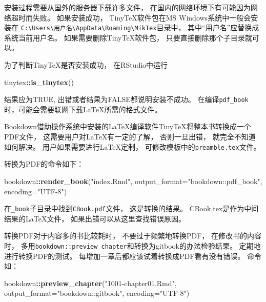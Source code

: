 \documentclass[
]{book}
\newenvironment{Shaded}{\begin{snugshade}}{\end{snugshade}}
\newcommand{\DataTypeTok}[1]{\textcolor[rgb]{0.13,0.29,0.53}{#1}}
\newcommand{\KeywordTok}[1]{\textcolor[rgb]{0.13,0.29,0.53}{\textbf{#1}}}
\newcommand{\NormalTok}[1]{#1}
\newcommand{\OperatorTok}[1]{\textcolor[rgb]{0.81,0.36,0.00}{\textbf{#1}}}
\newcommand{\StringTok}[1]{\textcolor[rgb]{0.31,0.60,0.02}{#1}}
\theoremstyle{definition}
\theoremstyle{definition}
\theoremstyle{definition}
\theoremstyle{definition}
\theoremstyle{remark}
\begin{document}
安装过程需要从国外的服务器下载许多文件，
在国内的网络环境下有可能因为网络超时而失败。
如果安装成功，
TinyTeX软件包在MS Windows系统中一般会安装在 \texttt{C:\textbackslash{}Users\textbackslash{}用户名\textbackslash{}AppData\textbackslash{}Roaming\textbackslash{}MikTex}目录中，
其中``用户名''应替换成系统当前用户名。
如果需要删除TinyTeX软件包， 只要直接删除那个子目录就可以。

为了判断TinyTeX是否安装成功， 在RStudio中运行

\begin{Shaded}
\begin{Highlighting}[]
\NormalTok{tinytex}\OperatorTok{::}\KeywordTok{is_tinytex}\NormalTok{()}
\end{Highlighting}
\end{Shaded}

结果应为TRUE, 出错或者结果为FALSE都说明安装不成功。
在编译\texttt{pdf\_book}时，可能会需要联网下载LaTeX所需的格式文件。

Bookdown借助操作系统中安装的LaTeX编译软件TinyTeX将整本书转换成一个PDF文件，
这需要用户对LaTeX有一定的了解，
否则一旦出错，
就完全不知道如何解决。
用户如果需要进行LaTeX定制，
可修改模板中的\texttt{preamble.tex}文件。

转换为PDF的命令如下：

\begin{Shaded}
\begin{Highlighting}[]
\NormalTok{bookdown}\OperatorTok{::}\KeywordTok{render_book}\NormalTok{(}\StringTok{"index.Rmd"}\NormalTok{, }
  \DataTypeTok{output_format=}\StringTok{"bookdown::pdf_book"}\NormalTok{, }\DataTypeTok{encoding=}\StringTok{"UTF-8"}\NormalTok{)}
\end{Highlighting}
\end{Shaded}

在\texttt{\_book}子目录中找到\texttt{CBook.pdf}文件，
这是转换的结果。
CBook.tex是作为中间结果的LaTeX文件，
如果出错可以从这里查找错误原因。

转换PDF对于内容多的书比较耗时，
不要过于频繁地转换PDF，
在修改书的内容时，
多用\texttt{bookdown::preview\_chapter}和转换为gitbook的办法检验结果。
定期地进行转换PDF的测试。
每增加一章后都应该试着转换成PDF看有没有错误。
命令如：

\begin{Shaded}
\begin{Highlighting}[]
\NormalTok{bookdown}\OperatorTok{::}\KeywordTok{preview_chapter}\NormalTok{(}\StringTok{"1001-chapter01.Rmd"}\NormalTok{, }
  \DataTypeTok{output_format=}\StringTok{"bookdown::gitbook"}\NormalTok{, }\DataTypeTok{encoding=}\StringTok{"UTF-8"}\NormalTok{)}
\end{Highlighting}
\end{Shaded}
\end{document}
